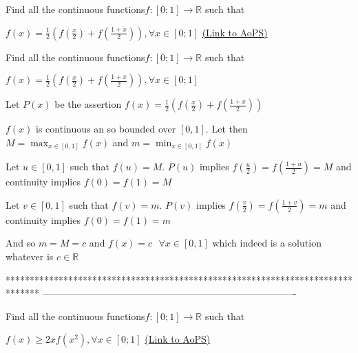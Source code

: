 \begin{problem}
	Find all the continuous functions$  f:\left [ 0;1 \right ]\rightarrow \mathbb{R}    $ such  that

$f(x)=\frac{1}{2}\left ( f\left ( \frac{x}{2} \right )+f\left ( \frac{1+x}{2} \right ) \right ),\forall x\in \left [ 0;1 \right ]$
	\flushright \href{https://artofproblemsolving.com/community/c6h618478}{(Link to AoPS)}
\end{problem}



\begin{solution}
	\begin{tcolorbox}Find all the continuous functions$  f:\left [ 0;1 \right ]\rightarrow \mathbb{R}    $ such  that

$f(x)=\frac{1}{2}\left ( f\left ( \frac{x}{2} \right )+f\left ( \frac{1+x}{2} \right ) \right ),\forall x\in \left [ 0;1 \right ]$\end{tcolorbox}
Let $P(x)$ be the assertion $f(x)=\frac 12\left(f(\frac x2)+f(\frac {1+x}2)\right)$

$f(x)$ is continuous an so bounded over $[0,1]$. Let then $M=\max_{x\in[0,1]}f(x)$ and $m=\min_{x\in[0,1]}f(x)$

Let $u\in[0,1]$ such that $f(u)=M$. $P(u)$ implies $f(\frac u2)=f(\frac{1+u}2)=M$ and continuity implies $f(0)=f(1)=M$

Let $v\in[0,1]$ such that $f(v)=m$. $P(v)$ implies $f(\frac v2)=f(\frac{1+v}2)=m$ and continuity implies $f(0)=f(1)=m$

And so $m=M=c$ and $\boxed{f(x)=c\text{  }\forall x\in[0,1]}$ which indeed is a solution whatever is $c\in\mathbb R$
\end{solution}
*******************************************************************************
-------------------------------------------------------------------------------

\begin{problem}
	Find all the continuous functions$  f: [ 0;1  ]\rightarrow \mathbb{R}    $ such  that

$f ( x  )\geq 2xf ( x^{2}) ,\forall x\in  [ 0;1  ]$
	\flushright \href{https://artofproblemsolving.com/community/c6h618479}{(Link to AoPS)}
\end{problem}



